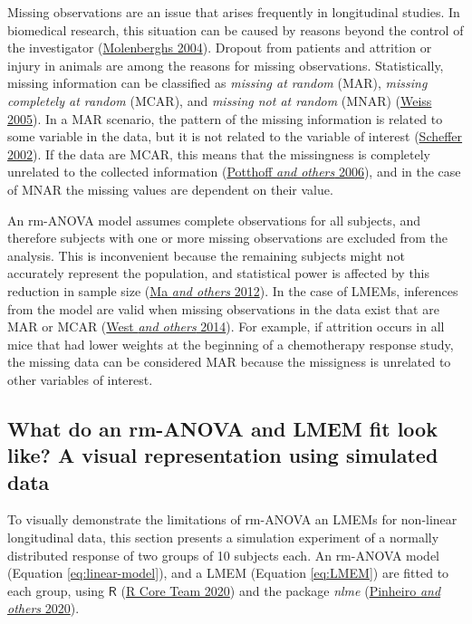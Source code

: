 \documentclass[
]{article}
\begin{document}
Missing observations are an issue that arises frequently in longitudinal studies. In biomedical research, this situation can be caused by reasons beyond the control of the investigator (\protect\hyperlink{ref-molenberghs2004}{Molenberghs 2004}). Dropout from patients and attrition or injury in animals are among the reasons for missing observations. Statistically, missing information can be classified as \emph{missing at random} (MAR), \emph{missing completely at random} (MCAR), and \emph{missing not at random} (MNAR) (\protect\hyperlink{ref-weiss2005}{Weiss 2005}). In a MAR scenario, the pattern of the missing information is related to some variable in the data, but it is not related to the variable of interest (\protect\hyperlink{ref-scheffer2002}{Scheffer 2002}). If the data are MCAR, this means that the missingness is completely unrelated to the collected information (\protect\hyperlink{ref-potthoff2006}{Potthoff \emph{and others} 2006}), and in the case of MNAR the missing values are dependent on their value.

An rm-ANOVA model assumes complete observations for all subjects, and therefore subjects with one or more missing observations are excluded from the analysis. This is inconvenient because the remaining subjects might not accurately represent the population, and statistical power is affected by this reduction in sample size (\protect\hyperlink{ref-ma2012}{Ma \emph{and others} 2012}). In the case of LMEMs, inferences from the model are valid when missing observations in the data exist that are MAR or MCAR (\protect\hyperlink{ref-west2014}{West \emph{and others} 2014}). For example, if attrition occurs in all mice that had lower weights at the beginning of a chemotherapy response study, the missing data can be considered MAR because the missigness is unrelated to other variables of interest.

\hypertarget{simulation}{%
\subsection{What do an rm-ANOVA and LMEM fit look like? A visual representation using simulated data}\label{simulation}}

To visually demonstrate the limitations of rm-ANOVA an LMEMs for non-linear longitudinal data, this section presents a simulation experiment of a normally distributed response of two groups of 10 subjects each. An rm-ANOVA model (Equation \eqref{eq:linear-model}), and a LMEM (Equation \eqref{eq:LMEM}) are fitted to each group, using \(\textsf{R}\) (\protect\hyperlink{ref-r}{R Core Team 2020}) and the package \emph{nlme} (\protect\hyperlink{ref-nlme}{Pinheiro \emph{and others} 2020}).
\end{document}
